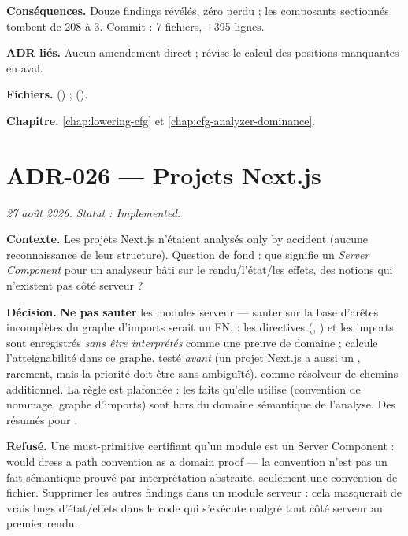 \textbf{Conséquences.} Douze findings révélés, zéro perdu ; les composants
\og sectionnés\fg{} tombent de 208 à 3. Commit  : 7 fichiers,
+395 lignes.

\textbf{ADR liés.} Aucun amendement direct ;  révise le calcul des
positions manquantes en aval.

\textbf{Fichiers.}  () ;
 ().

\textbf{Chapitre.} \cref{chap:lowering-cfg} et \cref{chap:cfg-analyzer-dominance}.

\section{ADR-026 --- Projets Next.js}
\label{adr:26}
\noindent\textit{27 août 2026. Statut : Implemented.}

\textbf{Contexte.} Les projets Next.js n'étaient analysés \og only by
accident\fg{} (aucune reconnaissance de leur structure). Question de fond :
que signifie un \emph{Server Component} pour un analyseur bâti sur le
rendu/l'état/les effets, des notions qui n'existent pas côté serveur ?

\textbf{Décision.} \textbf{Ne pas sauter} les modules serveur --- sauter sur
la base d'arêtes incomplètes du graphe d'imports serait un FN.  : les directives (, ) et les imports sont enregistrés \emph{sans être interprétés} comme
une preuve de domaine ;  calcule l'atteignabilité dans ce
graphe.  testé \emph{avant}  (un projet
Next.js a aussi un , rarement, mais la priorité doit être
sans ambiguïté).  comme résolveur de chemins additionnel. La
règle  est plafonnée \Warning{} : les faits
qu'elle utilise (convention de nommage, graphe d'imports) sont hors du
domaine sémantique de l'analyse. Des résumés pour .

\textbf{Refusé.} Une must-primitive certifiant qu'un module est un Server
Component : \og would dress a path convention as a domain proof\fg{} --- la
convention  n'est pas un fait sémantique prouvé par
interprétation abstraite, seulement une convention de fichier. Supprimer les
autres findings dans un module serveur : cela masquerait de vrais bugs
d'état/effets dans le code qui s'exécute malgré tout côté serveur au premier
rendu.

